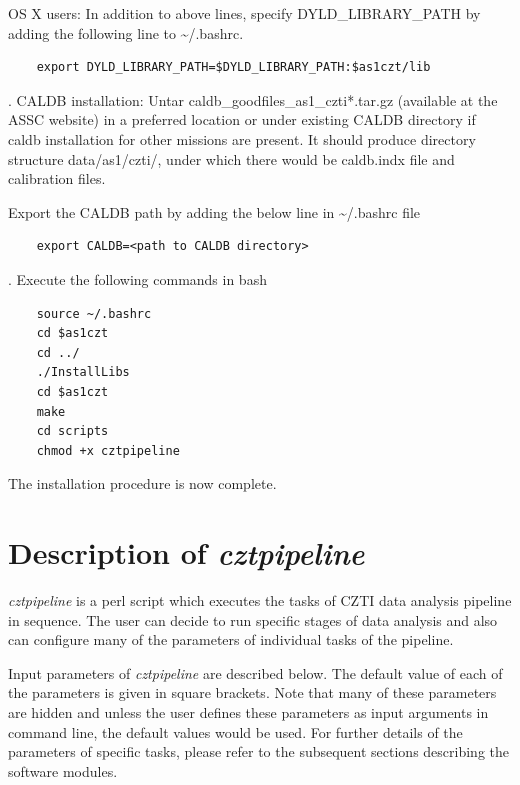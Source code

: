 \documentclass[11pt,oneside,a4paper]{article}
\begin{document}
OS X users: In addition to above lines, specify DYLD\_LIBRARY\_PATH by adding the following line to \textasciitilde/.bashrc.
\begin{verbatim} 
    export DYLD_LIBRARY_PATH=$DYLD_LIBRARY_PATH:$as1czt/lib
\end{verbatim}

. CALDB installation: 
    Untar  caldb\_goodfiles\_as1\_czti*.tar.gz (available at the ASSC website) in a preferred location or under existing CALDB directory if caldb installation for other missions are present. It should produce directory structure data/as1/czti/, under which there would be caldb.indx file and calibration files.

Export the CALDB path by adding the below line in  \textasciitilde/.bashrc file
\begin{verbatim} 
    export CALDB=<path to CALDB directory>
\end{verbatim}

. Execute the following commands in bash
\begin{verbatim}    
    source ~/.bashrc
    cd $as1czt
    cd ../
    ./InstallLibs
    cd $as1czt
    make
    cd scripts
    chmod +x cztpipeline
\end{verbatim}
The installation procedure is now complete.  
    	

\section{Description of \emph{cztpipeline}}

\emph{cztpipeline} is a perl script which executes the tasks of CZTI data analysis 
pipeline in sequence. The user can decide to run specific stages of data analysis and 
also can configure many of the parameters of individual tasks of the pipeline.

Input parameters of \emph{cztpipeline} are described below. The default value of 
each of the parameters is given in square brackets. Note that many of these parameters 
are hidden and unless the user defines these parameters as input arguments in command 
line, the default values would be used. For further details of the parameters of specific tasks, 
please refer to the subsequent sections describing the software modules. 

\end{document}

